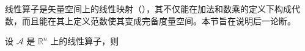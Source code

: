 线性算子是矢量空间上的线性映射（），其不仅能在加法和数乘的定义下构成代数，而且能在其上定义范数使其变成完备度量空间。本节旨在说明后一论断。
\begin{definition}{}
设 $\mathcal A$ 是 $\mathbb R^n$ 上的线性算子，则
\end{definition}